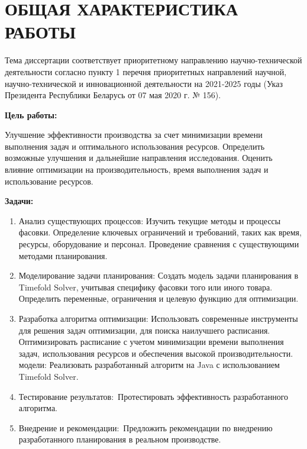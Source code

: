 \chapter*{ОБЩАЯ ХАРАКТЕРИСТИКА РАБОТЫ}
\label{ch:target}

Тема диссертации соответствует приоритетному направлению научно-технической деятельности согласно пункту 1 перечня приоритетных направлений научной, научно-технической и инновационной деятельности на 2021-2025 годы (Указ Президента Республики Беларусь от 07 мая 2020 г. № 156).

\medskip  %
\bigskip  %

\noindent \textbf{Цель работы:}

Улучшение эффективности производства за счет минимизации времени выполнения задач и оптимального использования ресурсов. Определить возможные улучшения и дальнейшие направления исследования. Оценить влияние оптимизации на производительность, время выполнения задач и использование ресурсов.

\noindent \textbf{Задачи:}
\begin{enumerate}
    \item Анализ существующих процессов:
Изучить текущие методы и процессы фасовки.
Определение ключевых ограничений и требований, таких как время, ресурсы, оборудование и персонал. Проведение сравнения с существующими методами планирования.
    \item  Моделирование задачи планирования:
Создать модель задачи планирования в Timefold Solver, учитывая специфику фасовки того или иного товара. Определить переменные, ограничения и целевую функцию для оптимизации.
    \item Разработка алгоритма оптимизации:
Использовать современные инструменты для решения задач оптимизации, для поиска наилучшего расписания.
Оптимизировать расписание с учетом минимизации времени выполнения задач, использования ресурсов и обеспечения высокой производительности.
     модели:
Реализовать разработанный алгоритм на Java с использованием Timefold Solver.
    \item Тестирование результатов:\
Протестировать эффективность разработанного алгоритма.
\item Внедрение и рекомендации:\
Предложить рекомендации по внедрению разработанного планирования в реальном производстве.
\end{enumerate}

\vspace{6mm}


